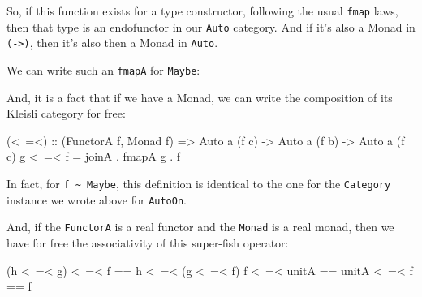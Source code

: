 \documentclass[]{article}
\newenvironment{Shaded}{}{}
\newcommand{\KeywordTok}[1]{\textcolor[rgb]{0.00,0.44,0.13}{\textbf{{#1}}}}
\newcommand{\DataTypeTok}[1]{\textcolor[rgb]{0.56,0.13,0.00}{{#1}}}
\newcommand{\OtherTok}[1]{\textcolor[rgb]{0.00,0.44,0.13}{{#1}}}
\newcommand{\FunctionTok}[1]{\textcolor[rgb]{0.02,0.16,0.49}{{#1}}}
\newcommand{\NormalTok}[1]{{#1}}
\begin{document}
So, if this function exists for a type constructor, following the usual
\texttt{fmap} laws, then that type is an endofunctor in our
\texttt{Auto} category. And if it's also a Monad in
\texttt{(-\textgreater{})}, then it's also then a Monad in
\texttt{Auto}.

We can write such an \texttt{fmapA} for \texttt{Maybe}:

\begin{Shaded}
\end{Shaded}

And, it is a fact that if we have a Monad, we can write the composition
of its Kleisli category for free:

\begin{Shaded}
\begin{Highlighting}[]
\OtherTok{(<~=<) ::} \NormalTok{(}\DataTypeTok{FunctorA} \NormalTok{f, }\DataTypeTok{Monad} \NormalTok{f) }\OtherTok{=>} \DataTypeTok{Auto} \NormalTok{a (f c) }\OtherTok{->} \DataTypeTok{Auto} \NormalTok{a (f b) }\OtherTok{->} \DataTypeTok{Auto} \NormalTok{a (f c)}
\NormalTok{g }\FunctionTok{<~=<} \NormalTok{f }\FunctionTok{=} \NormalTok{joinA }\FunctionTok{.} \NormalTok{fmapA g }\FunctionTok{.} \NormalTok{f}
\end{Highlighting}
\end{Shaded}

In fact, for \texttt{f\ \textasciitilde{}\ Maybe}, this definition is
identical to the one for the \texttt{Category} instance we wrote above
for \texttt{AutoOn}.

And, if the \texttt{FunctorA} is a real functor and the \texttt{Monad}
is a real monad, then we have for free the associativity of this
super-fish operator:

\begin{Shaded}
\begin{Highlighting}[]
\NormalTok{(h }\FunctionTok{<~=<} \NormalTok{g) }\FunctionTok{<~=<} \NormalTok{f }\FunctionTok{==} \NormalTok{h }\FunctionTok{<~=<} \NormalTok{(g }\FunctionTok{<~=<} \NormalTok{f)}
\NormalTok{f }\FunctionTok{<~=<} \NormalTok{unitA      }\FunctionTok{==} \NormalTok{unitA }\FunctionTok{<~=<} \NormalTok{f      }\FunctionTok{==} \NormalTok{f}
\end{Highlighting}
\end{Shaded}
\end{document}
